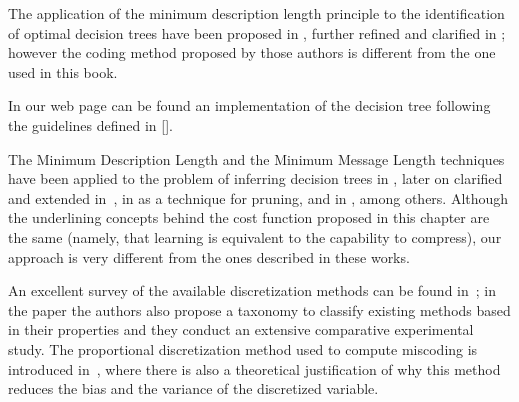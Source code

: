 The application of the minimum description length principle to the identification of optimal decision trees have been proposed in \cite{quinlan1989inferring}, further refined and clarified in \cite{wallace1993coding}; however the coding method proposed by those authors is different from the one used in this book.

In our web page can be found an implementation of the decision tree following the guidelines defined in []. 


The Minimum Description Length \cite{grunwald2007minimum} and the Minimum Message Length \cite{wallace2005statistical} techniques have been applied to the problem of inferring decision trees in \cite{quinlan1989inferring}, later on clarified and extended in~\cite{wallace1993coding}, in \cite{mehta1995mdl} as a technique for pruning, and in \cite{rastogi1998public}, among others. Although the underlining concepts behind the cost function proposed in this chapter are the same (namely, that learning is equivalent to the capability to compress), our approach is very different from the ones described in these works.

An excellent survey of the available discretization methods can be found in~\cite{garcia2013survey}; in the paper the authors also propose a taxonomy to classify existing methods based in their properties and they conduct an extensive comparative experimental study. The proportional discretization method used to compute miscoding is introduced in~\cite{yang2009discretization}, where there is also a theoretical justification of why this method reduces the bias and the variance of the discretized variable.



